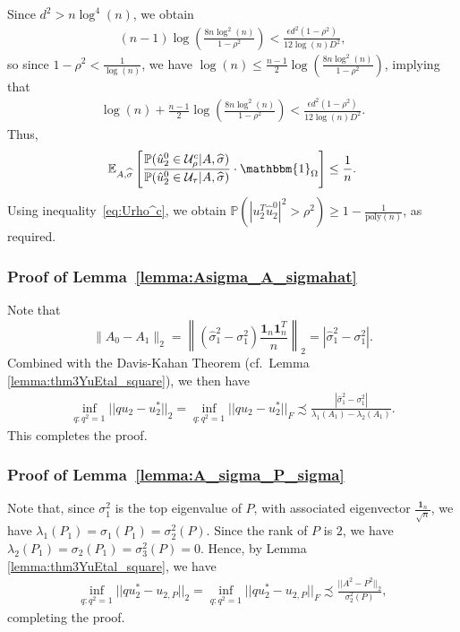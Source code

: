 \documentclass{article}
\newcommand{\mprob}{\mathbb{P}}
\newcommand{\sigmahat}{\ensuremath{\widehat{\sigma}}}
\begin{document}
Since $d^2 > n\log^4(n)$, we obtain
\begin{align*}
(n - 1)\log\left(\frac{8n\log^2(n)}{1 - \rho^2}\right) < \frac{\epsilon d^2(1 - \rho^2)}{12\log(n)D^2},
\end{align*}
so since $1 - \rho^2 < \frac{1}{\log(n)}$, we have $\log(n) \leq \frac{n - 1}{2}\log\left(\frac{8n\log^2(n)}{1 - \rho^2}\right)$, implying that
\begin{align*}
\log(n) + \frac{n - 1}{2}\log\left(\frac{8n\log^2(n)}{1 - \rho^2}\right) < \frac{\epsilon d^2(1 - \rho^2)}{12\log(n)D^2}.
\end{align*}
Thus, 
\begin{align*}
\mathbb{E}_{A, \sigmahat}\left[\frac{\mprob(\hat{u}_2^0 \in \mathcal{U}^c_\rho|A, \sigmahat)}{\mprob(\hat{u}_2^0 \in \mathcal{U}_\tau|A, \sigmahat)}\cdot \mathbbm{1}_{\Omega}\right] \leq \frac{1}{n}.
\end{align*}
Using inequality~\eqref{eq:Urho^c}, we obtain $\mprob(|u_2^T\hat{u}_2^0|^2 > \rho^2) \geq 1 - \frac{1}{\mathrm{poly}(n)}$, as required.


\subsubsection{Proof of Lemma~\ref{lemma:Asigma_A_sigmahat}}
\label{AppAsigma}

Note that
\begin{equation*}
\|A_0 - A_1\|_2 = \left\|(\sigmahat_1^2 - \sigma_1^2) \frac{\textbf{1}_n\textbf{1}_n^T}{n}\right\|_2 = |\sigmahat_1^2 - \sigma_1^2|.
\end{equation*}
Combined with the Davis-Kahan Theorem (cf.\ Lemma \ref{lemma:thm3YuEtal_square}), we then have
\begin{align*}
\mathop{\inf}_{q: q^2 = 1}||qu_2 - u_2^*||_2 = \mathop{\inf}_{q: q^2 = 1}||qu_2 - u_2^*||_F \precsim \frac{|\sigmahat_1^2 - \sigma_1^2|}{\lambda_1(A_1) - \lambda_2(A_1)}.
\end{align*}
This completes the proof.


\subsubsection{Proof of Lemma~\ref{lemma:A_sigma_P_sigma}}
\label{AppASigmaP}

Note that, since $\sigma_1^2$ is the top eigenvalue of $P$, with associated eigenvector $\frac{\mathbf{1}_n}{\sqrt{n}}$, we have $\lambda_1(P_1) = \sigma_1(P_1) = \sigma_2^2(P)$. Since the rank of $P$ is $2$, we have $\lambda_2(P_1) = \sigma_2(P_1) = \sigma_3^2(P) = 0$. Hence, by Lemma \ref{lemma:thm3YuEtal_square}, we have
\begin{align*}
\mathop{\inf}_{q: q^2 = 1}||qu_2^* - u_{2, P}||_2 = \mathop{\inf}_{q: q^2 = 1}||qu_2^* - u_{2, P}||_F \precsim \frac{||A^2 - P^2||_2}{\sigma_2^2(P)},
\end{align*}
completing the proof.
\end{document}
